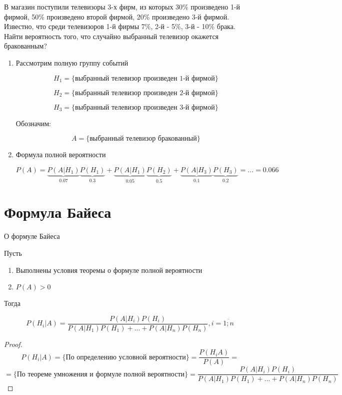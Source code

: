 \documentclass[a4paper, 14pt]{report}
\begin{document}
В магазин поступили телевизоры 3-х фирм, из которых 30\% произведено 1-й фирмой, 50\% произведено второй фирмой, 20\% произведено 3-й фирмой. Известно, что среди телевизоров 1-й фирмы 7\%, 2-й - 5\%, 3-й - 10\% брака. Найти вероятность того, что случайно выбранный телевизор окажется бракованным?

\begin{enumerate}
    \item Рассмотрим полную группу событий

        $$
        H_1 = \{ \text{выбранный телевизор произведен 1-й фирмой} \}
        $$


        $$
        H_2 = \{ \text{выбранный телевизор произведен 2-й фирмой} \}
        $$


        $$
        H_3 = \{ \text{выбранный телевизор произведен 3-й фирмой} \}
        $$

        Обозначим:

        $$
        A = \{ \text{выбранный телевизор бракованный} \}
        $$

    \item Формула полной вероятности

        $$
        P(A) = \underbrace{P(A|H_1)}_{0.07} \underbrace{P(H_1)}_{0.3} + \underbrace{P(A|H_1)}_{0.05} \underbrace{P(H_2)}_{0.5} + \underbrace{P(A|H_3)}_{0.1} \underbrace{P(H_3)}_{0.2} = ... = 0.066
        $$
\end{enumerate}

\section{Формула Байеса}

\begin{theorem}
    О формуле Байеса

    Пусть

    \begin{enumerate}
        \item Выполнены условия теоремы о формуле полной вероятности
        \item $P(A) > 0$
    \end{enumerate}

    Тогда

    $$
    P(H_i|A) = \frac{P(A|H_i) P(H_i)}{P(A|H_1) P(H_1) + ... + P(A|H_n) P(H_n) }, i = \overline{1;n}
    $$
\end{theorem}

\begin{proof}
    $$
    P(H_i|A) = \{\text{По определению условной вероятности}\}= \frac{P(H_i A)}{P(A)} = 
    $$
     $$
    = \{\text{По теореме умножения и формуле полной вероятности}\}= \frac{P(A|H_i) P(H_i)}{P(A|H_1) P(H_1) + ... + P(A|H_n) P(H_n) }
    $$
\end{proof}
\end{document}
